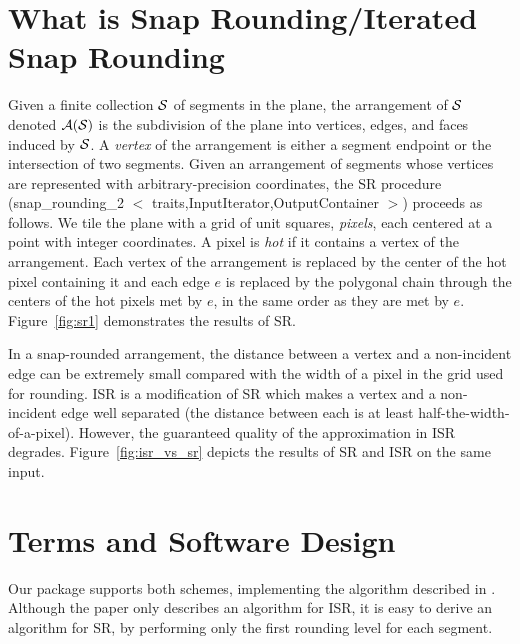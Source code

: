 \section{What is Snap Rounding/Iterated Snap Rounding}
Given a finite collection $\S$ of segments in the plane, the
arrangement of $\S$ denoted $\A(\S)$ is the subdivision of the plane
into vertices, edges, and faces induced by $\S$. %
A {\it vertex\/} of the arrangement is either a segment endpoint or
the intersection of two segments. Given an arrangement of segments
whose vertices are represented with arbitrary-precision coordinates,
the SR procedure
(snap\_rounding\_2 $<$ traits,InputIterator,OutputContainer $>$)
proceeds as follows.  We tile the plane
with a grid of unit squares, {\it pixels}, each centered at a point
with integer coordinates. A pixel is {\it hot\/} if it contains a
vertex of the arrangement. Each vertex of the arrangement is replaced
by the center of the hot pixel containing it and each edge $e$ is
replaced by the polygonal chain through the centers of the hot pixels
met by $e$, in the same order as they are met by $e$. 
Figure~\ref{fig:sr1} demonstrates the results of SR.

In a snap-rounded arrangement, the distance between a vertex and
a non-incident edge can be extremely small compared with the width of a
pixel in the grid used for rounding. ISR
is a modification of SR which makes a vertex and a
non-incident edge well separated (the distance between each is at least
half-the-width-of-a-pixel). However, the guaranteed quality of the
approximation in ISR degrades. Figure~\ref{fig:isr_vs_sr} depicts
the results of SR and ISR on the same input.

\section{Terms and Software Design}

Our package supports both schemes, implementing the algorithm described in \cite{isr-2002}.
Although the paper only describes an algorithm for ISR,
it is easy to derive an algorithm for SR, by performing only
the first rounding level for each segment.

